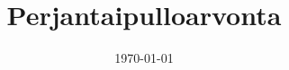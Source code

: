 \documentclass{beamer}
\title{Perjantaipulloarvonta}
\author{
}
\date{\today}
\begin{document}
\frame{\titlepage}



\end{document}
